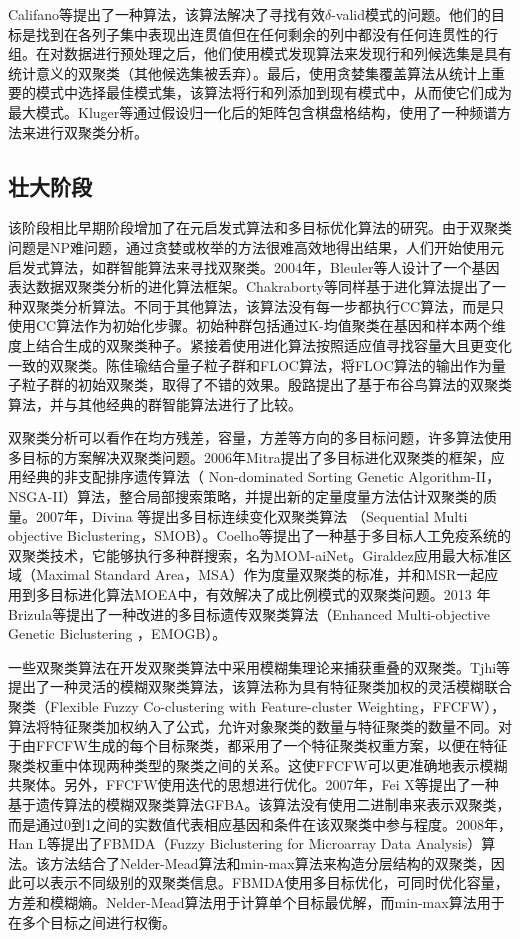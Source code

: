     Califano等提出了一种算法，该算法解决了寻找有效$\delta$-valid模式的问题。他们的目标是找到在各列子集中表现出连贯值但在任何剩余的列中都没有任何连贯性的行组。在对数据进行预处理之后，他们使用模式发现算法来发现行和列候选集是具有统计意义的双聚类（其他候选集被丢弃）。最后，使用贪婪集覆盖算法从统计上重要的模式中选择最佳模式集，该算法将行和列添加到现有模式中，从而使它们成为最大模式。Kluger等通过假设归一化后的矩阵包含棋盘格结构，使用了一种频谱方法来进行双聚类分析。

    \subsection{壮大阶段}
    该阶段相比早期阶段增加了在元启发式算法和多目标优化算法的研究。由于双聚类问题是NP难问题，通过贪婪或枚举的方法很难高效地得出结果，人们开始使用元启发式算法，如群智能算法来寻找双聚类。2004年，Bleuler等人设计了一个基因表达数据双聚类分析的进化算法框架。Chakraborty等同样基于进化算法提出了一种双聚类分析算法。不同于其他算法，该算法没有每一步都执行CC算法，而是只使用CC算法作为初始化步骤。初始种群包括通过K-均值聚类在基因和样本两个维度上结合生成的双聚类种子。紧接着使用进化算法按照适应值寻找容量大且更变化一致的双聚类。陈佳瑜结合量子粒子群和FLOC算法，将FLOC算法的输出作为量子粒子群的初始双聚类，取得了不错的效果。殷路提出了基于布谷鸟算法的双聚类算法，并与其他经典的群智能算法进行了比较。
    
    双聚类分析可以看作在均方残差，容量，方差等方向的多目标问题，许多算法使用多目标的方案解决双聚类问题。2006年Mitra提出了多目标进化双聚类的框架，应用经典的非支配排序遗传算法（ Non-dominated Sorting Genetic Algorithm-II，NSGA-II）算法，整合局部搜索策略，并提出新的定量度量方法估计双聚类的质量。2007年，Divina 等提出多目标连续变化双聚类算法 （Sequential Multi objective Biclustering，SMOB）。Coelho等提出了一种基于多目标人工免疫系统的双聚类技术，它能够执行多种群搜索，名为MOM-aiNet。Giraldez应用最大标准区域（Maximal Standard Area，MSA）作为度量双聚类的标准，并和MSR一起应用到多目标进化算法MOEA中，有效解决了成比例模式的双聚类问题。2013 年Brizula等提出了一种改进的多目标遗传双聚类算法（Enhanced Multi-objective Genetic Biclustering ，EMOGB）。    

    一些双聚类算法在开发双聚类算法中采用模糊集理论来捕获重叠的双聚类。Tjhi等提出了一种灵活的模糊双聚类算法，该算法称为具有特征聚类加权的灵活模糊联合聚类（Flexible Fuzzy Co-clustering with Feature-cluster Weighting，FFCFW），算法将特征聚类加权纳入了公式，允许对象聚类的数量与特征聚类的数量不同。对于由FFCFW生成的每个目标聚类，都采用了一个特征聚类权重方案，以便在特征聚类权重中体现两种类型的聚类之间的关系。这使FFCFW可以更准确地表示模糊共聚体。另外，FFCFW使用迭代的思想进行优化。2007年，Fei X等提出了一种基于遗传算法的模糊双聚类算法GFBA。该算法没有使用二进制串来表示双聚类，而是通过0到1之间的实数值代表相应基因和条件在该双聚类中参与程度。2008年，Han L等提出了FBMDA（Fuzzy Biclustering for Microarray Data Analysis）算法。该方法结合了Nelder-Mead算法和min-max算法来构造分层结构的双聚类，因此可以表示不同级别的双聚类信息。FBMDA使用多目标优化，可同时优化容量，方差和模糊熵。Nelder-Mead算法用于计算单个目标最优解，而min-max算法用于在多个目标之间进行权衡。

